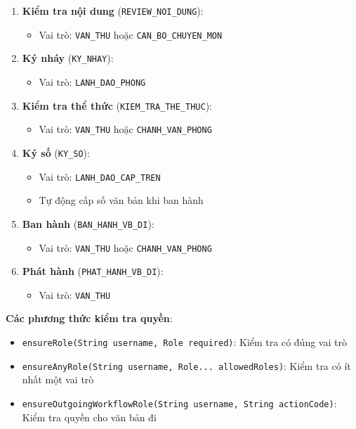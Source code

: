 \documentclass[12pt,a4paper]{article}
\begin{document}
\begin{enumerate}
    \item \textbf{Kiểm tra nội dung} (\texttt{REVIEW\_NOI\_DUNG}):
    \begin{itemize}
        \item Vai trò: \texttt{VAN\_THU} hoặc \texttt{CAN\_BO\_CHUYEN\_MON}
    \end{itemize}
    
    \item \textbf{Ký nháy} (\texttt{KY\_NHAY}):
    \begin{itemize}
        \item Vai trò: \texttt{LANH\_DAO\_PHONG}
    \end{itemize}
    
    \item \textbf{Kiểm tra thể thức} (\texttt{KIEM\_TRA\_THE\_THUC}):
    \begin{itemize}
        \item Vai trò: \texttt{VAN\_THU} hoặc \texttt{CHANH\_VAN\_PHONG}
    \end{itemize}
    
    \item \textbf{Ký số} (\texttt{KY\_SO}):
    \begin{itemize}
        \item Vai trò: \texttt{LANH\_DAO\_CAP\_TREN}
        \item Tự động cấp số văn bản khi ban hành
    \end{itemize}
    
    \item \textbf{Ban hành} (\texttt{BAN\_HANH\_VB\_DI}):
    \begin{itemize}
        \item Vai trò: \texttt{VAN\_THU} hoặc \texttt{CHANH\_VAN\_PHONG}
    \end{itemize}
    
    \item \textbf{Phát hành} (\texttt{PHAT\_HANH\_VB\_DI}):
    \begin{itemize}
        \item Vai trò: \texttt{VAN\_THU}
    \end{itemize}
\end{enumerate}

\textbf{Các phương thức kiểm tra quyền}:
\begin{itemize}
    \item \texttt{ensureRole(String username, Role required)}: Kiểm tra có đúng vai trò
    \item \texttt{ensureAnyRole(String username, Role... allowedRoles)}: Kiểm tra có ít nhất một vai trò
    \item \texttt{ensureOutgoingWorkflowRole(String username, String actionCode)}: Kiểm tra quyền cho văn bản đi
\end{itemize}
\end{document}
